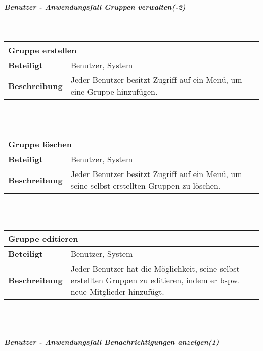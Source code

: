 \documentclass[12pt,a4paper]{article}
\begin{document}
\subparagraph{Benutzer - Anwendungsfall \glqq Gruppen verwalten\grqq (-2)}\mbox{}\\

\begin{tabular}{l p{10cm}}
\multicolumn{2}{l}{\textbf{Gruppe erstellen}} \\ \hline
\textbf{Beteiligt} & Benutzer, System \\ \hline 
\textbf{Beschreibung} & Jeder Benutzer besitzt Zugriff auf ein Menü, um eine Gruppe hinzufügen.\\ 
\hline 
\end{tabular}\\\\

\begin{tabular}{l p{10cm}}
\multicolumn{2}{l}{\textbf{Gruppe löschen}} \\ \hline
\textbf{Beteiligt} & Benutzer, System \\ \hline 
\textbf{Beschreibung} & Jeder Benutzer besitzt Zugriff auf ein Menü, um seine selbst erstellten Gruppen zu löschen.\\ 
\hline 
\end{tabular}\\\\

\begin{tabular}{l p{10cm}}
\multicolumn{2}{l}{\textbf{Gruppe editieren}} \\ \hline
\textbf{Beteiligt} & Benutzer, System \\ \hline 
\textbf{Beschreibung} & Jeder Benutzer hat die Möglichkeit, seine selbst erstellten Gruppen zu editieren, indem er bspw. neue Mitglieder hinzufügt.\\ 
\hline 
\end{tabular}\\\\
\subparagraph{Benutzer - Anwendungsfall \glqq Benachrichtigungen anzeigen\grqq  (1)}\mbox{}\\
\end{document}
